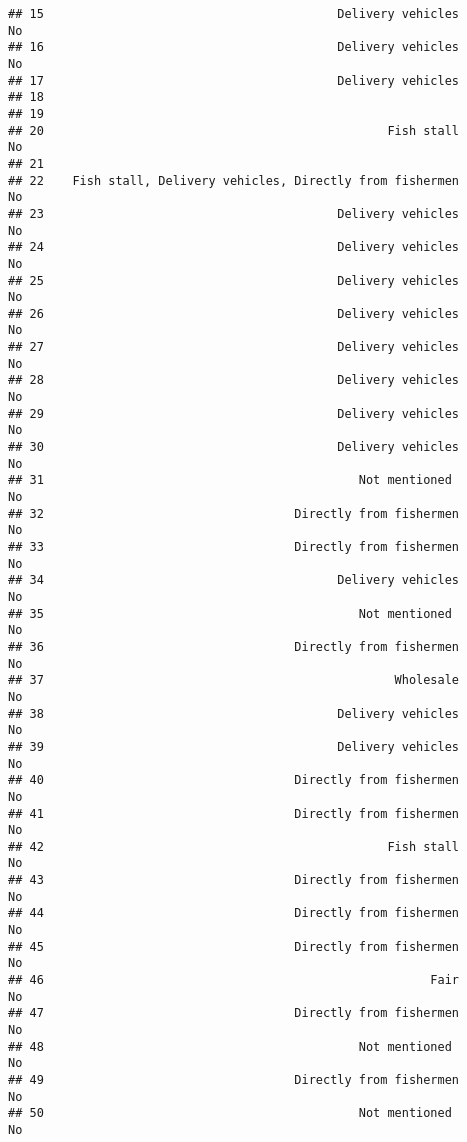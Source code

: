 \documentclass[
]{article}
\begin{document}
\begin{verbatim}
## 15                                         Delivery vehicles        No
## 16                                         Delivery vehicles        No
## 17                                         Delivery vehicles          
## 18                                                                    
## 19                                                                    
## 20                                                Fish stall        No
## 21                                                                    
## 22    Fish stall, Delivery vehicles, Directly from fishermen        No
## 23                                         Delivery vehicles        No
## 24                                         Delivery vehicles        No
## 25                                         Delivery vehicles        No
## 26                                         Delivery vehicles        No
## 27                                         Delivery vehicles        No
## 28                                         Delivery vehicles        No
## 29                                         Delivery vehicles        No
## 30                                         Delivery vehicles        No
## 31                                            Not mentioned         No
## 32                                   Directly from fishermen        No
## 33                                   Directly from fishermen        No
## 34                                         Delivery vehicles        No
## 35                                            Not mentioned         No
## 36                                   Directly from fishermen        No
## 37                                                 Wholesale        No
## 38                                         Delivery vehicles        No
## 39                                         Delivery vehicles        No
## 40                                   Directly from fishermen        No
## 41                                   Directly from fishermen        No
## 42                                                Fish stall        No
## 43                                   Directly from fishermen        No
## 44                                   Directly from fishermen        No
## 45                                   Directly from fishermen        No
## 46                                                      Fair        No
## 47                                   Directly from fishermen        No
## 48                                            Not mentioned         No
## 49                                   Directly from fishermen        No
## 50                                            Not mentioned         No

\end{verbatim}
\end{document}
